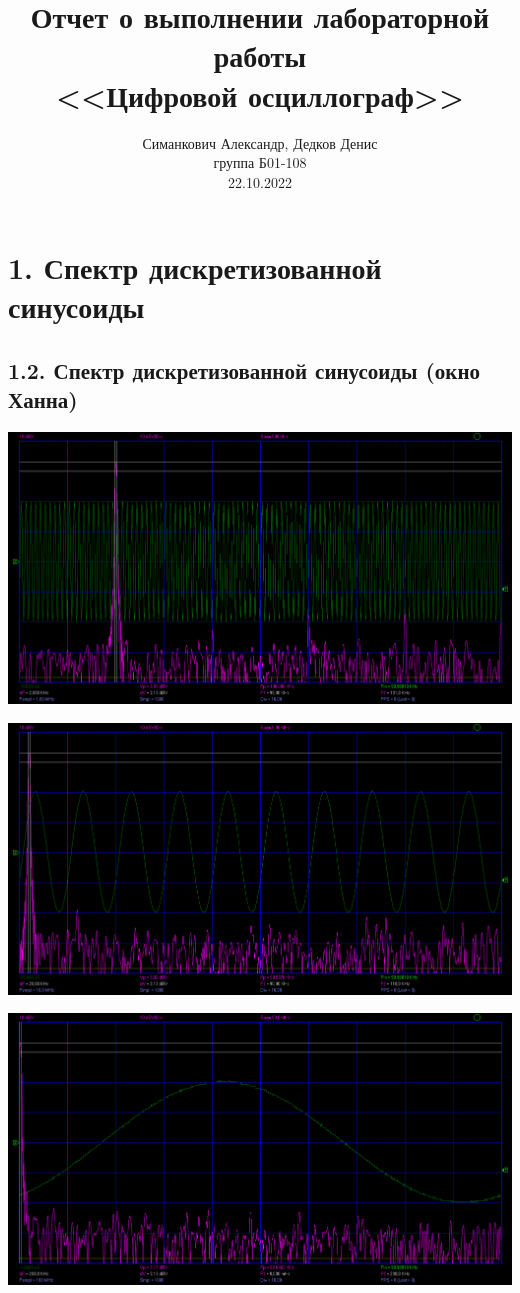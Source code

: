 \documentclass[12pt,a4paper]{article}
\author{\normalsize Симанкович Александр, Дедков Денис
	\\ \normalsize группа Б01-108 \\
	\normalsize 22.10.2022}
\date{}
\title{
	\large Отчет о выполнении лабораторной работы \\
	\Large <<Цифровой осциллограф>> \\ 
	
}
\begin{document}
\maketitle
\newpage
\section*{1. Спектр дискретизованной синусоиды}
\subsection*{1.2. Спектр дискретизованной синусоиды (окно Ханна)}
\vspace*{20pt}

\begin{center}
	\includegraphics[width=.8\linewidth]{data/1-2_hanna_1MHZ}\hfill
\end{center}	
\begin{center}
	\includegraphics[width=.8\linewidth]{data/1-2_hanna_10MHZ}\hfill
\end{center}	
\begin{center}
	\includegraphics[width=.8\linewidth]{data/1-2_hanna_100MHZ}\hfill
\end{center}	
\end{document}
